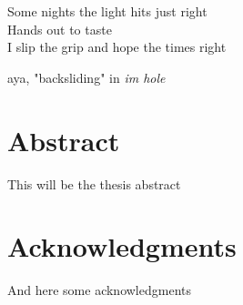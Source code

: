 \newpage
\thispagestyle{empty}
\vspace*{4cm}
\begin{flushright}
    \epigraph{
        Some nights the light hits just right\\
        Hands out to taste\\
        I slip the grip and hope the times right}{aya, "backsliding" in \emph{im hole}}
\end{flushright}   
\newpage

\chapter*{Abstract}

This will be the thesis abstract

\chapter*{Acknowledgments}

And here some acknowledgments

